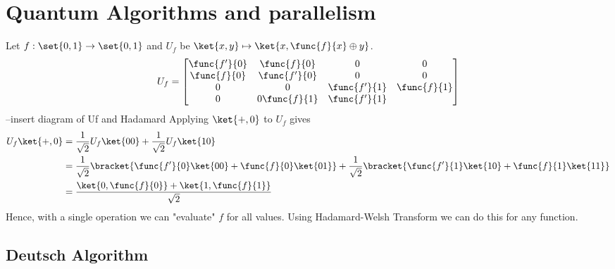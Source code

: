 \section{Quantum Algorithms and parallelism}
Let \(f : \set{0,1} \to \set{0,1}\) and \(U_f\) be \(\ket{x,y} \mapsto \ket{x, \func{f}{x} \oplus y}\).
\begin{equation*}
    U_f = \begin{bmatrix}
        \func{f'}{0} & \func{f}{0} & 0 & 0\\
        \func{f}{0} & \func{f'}{0} & 0 & 0\\
        0 & 0 & \func{f'}{1} & \func{f}{1}\\
        0 & 0 \func{f}{1} & \func{f'}{1} 
    \end{bmatrix}
\end{equation*}
--insert diagram of Uf and Hadamard
Applying \(\ket{+,0}\) to \(U_f\) gives 
\begin{align*}
    U_f \ket{+,0} &= \dfrac{1}{\sqrt{2}} U_f \ket{00} +  \dfrac{1}{\sqrt{2}} U_f \ket{10}\\
    &= \dfrac{1}{\sqrt{2}} \bracket{\func{f'}{0}\ket{00} + \func{f}{0}\ket{01}} + \dfrac{1}{\sqrt{2}} \bracket{\func{f'}{1}\ket{10} + \func{f}{1}\ket{11}}\\
    &= \dfrac{\ket{0,\func{f}{0}} + \ket{1,\func{f}{1}}}{\sqrt{2}}
\end{align*}
Hence, with a single operation we can "evaluate" \(f\) for all values. Using Hadamard-Welsh Transform we can do this for any function.
\subsection{Deutsch Algorithm}

